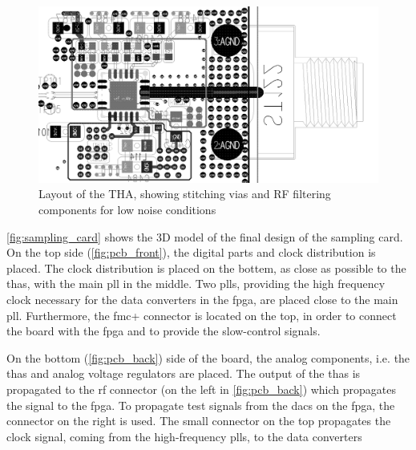  \begin{figure}[tb]
 	\centering
 	\includegraphics[width = \textwidth]{chap/04-theresa/img/pcb/tha_pcb}
 	\caption[THA layout]{Layout of the THA, showing stitching vias and RF filtering components for low noise conditions}
 	\label{fig:stitch}
 \end{figure}

\autoref{fig:sampling_card} shows the 3D model of the final design of the sampling card.
On the top side (\autoref{fig:pcb_front}), the digital parts and clock distribution is placed. 
The clock distribution is placed on the bottem, as close as possible to the \glspl{tha}, with the main \gls{pll} in the middle.
Two \glspl{pll}, providing the high frequency clock necessary for the data converters in the \gls{fpga}, are placed close to the main \gls{pll}.
Furthermore, the \gls{fmc}+ connector is located on the top, in order to connect the board with the \gls{fpga} and to provide the slow-control signals.

On the bottom (\autoref{fig:pcb_back}) side of the board, the analog components, i.e. the \glspl{tha} and analog voltage regulators are placed. 
The output of the \glspl{tha} is propagated to the \gls{rf} connector (on the left in \autoref{fig:pcb_back}) which propagates the signal to the \gls{fpga}. 
To propagate test signals from the \glspl{dac} on the \gls{fpga}, the connector on the right is used.
The small connector on the top propagates the clock signal, coming from the high-frequency \glspl{pll}, to the data converters 

